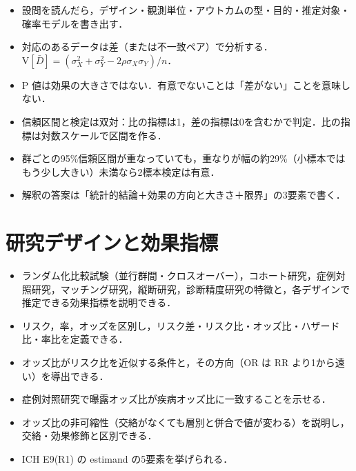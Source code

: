 \documentclass[a4paper,11pt,openany]{ltjsbook}
\newcommand{\V}{\mathrm{V}}
\begin{document}
\begin{summarybox}
\begin{itemize}
\item 設問を読んだら，デザイン・観測単位・アウトカムの型・目的・推定対象・確率モデルを書き出す．
\item 対応のあるデータは差（または不一致ペア）で分析する．$\V[\bar D]=(\sigma_X^2+\sigma_Y^2-2\rho\sigma_X\sigma_Y)/n$．
\item P 値は効果の大きさではない．有意でないことは「差がない」ことを意味しない．
\item 信頼区間と検定は双対：比の指標は1，差の指標は0を含むかで判定．比の指標は対数スケールで区間を作る．
\item 群ごとの95\%信頼区間が重なっていても，重なりが幅の約29\%（小標本ではもう少し大きい）未満なら2標本検定は有意．
\item 解釈の答案は「統計的結論＋効果の方向と大きさ＋限界」の3要素で書く．
\end{itemize}
\end{summarybox}

\chapter{研究デザインと効果指標}\label{ch:02}

\begin{goalbox}
\begin{itemize}
\item ランダム化比較試験（並行群間・クロスオーバー），コホート研究，症例対照研究，マッチング研究，縦断研究，診断精度研究の特徴と，各デザインで推定できる効果指標を説明できる．
\item リスク，率，オッズを区別し，リスク差・リスク比・オッズ比・ハザード比・率比を定義できる．
\item オッズ比がリスク比を近似する条件と，その方向（OR は RR より1から遠い）を導出できる．
\item 症例対照研究で曝露オッズ比が疾病オッズ比に一致することを示せる．
\item オッズ比の非可縮性（交絡がなくても層別と併合で値が変わる）を説明し，交絡・効果修飾と区別できる．
\item ICH E9(R1) の estimand の5要素を挙げられる．
\end{itemize}
\end{goalbox}
\end{document}
